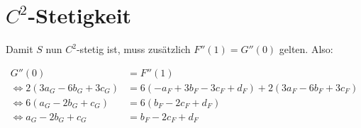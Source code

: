 \documentclass[a4paper]{scrartcl}
\begin{document}
    \section{$C^2$-Stetigkeit}
    Damit $S$ nun $C^2$-stetig ist, muss zusätzlich $F''(1) = G''(0)$ gelten. Also:

    \begin{align}
        G''(0) &= F''(1)\\
        \Leftrightarrow 2 (3 a_G-6 b_G+3 c_G)
                     &= 6 (-a_F + 3 b_F-3 c_F+d_F) + 2 (3 a_F-6 b_F+3 c_F)\\
        \Leftrightarrow 6 (a_G - 2 b_G + c_G) &= 6 (b_F-2 c_F+d_F)\\
        \Leftrightarrow a_G - 2 b_G + c_G &= b_F-2 c_F+d_F
    \end{align}
\end{document}

